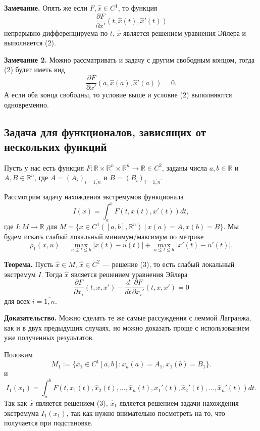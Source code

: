 \QED

\textbf{Замечание.} Опять же если $F, \widehat x \in C^1$, то функция
\[
    \frac{\partial F}{\partial x'}(t, \widehat x(t), \widehat x'(t))
\]
непрерывно дифференцируема по $t$, $\widehat x$ является решением уравнения Эйлера и выполняется (2).

\textbf{Замечание 2.} Можно рассматривать и задачу с другим свободным концом, тогда (2) будет иметь вид
\[
    \frac{\partial F}{\partial x'}(a, \widehat x(a), \widehat x'(a)) = 0.
\]
А если оба конца свободны, то условие выше и условие (2) выполняются одновременно.

\subsection{Задача для функционалов, зависящих от нескольких функций}
Пусть у нас есть функция $F: \mathbb R \times \mathbb R^n \times \mathbb R^n \to \mathbb R \in C^2$, заданы числа $a, b \in \mathbb R$ и $A, B \in \mathbb R^n$, где $A = (A_i)_{i = \overline{1, n}}$ и $B = (B_i)_{i = \overline{1, n}}$.

Рассмотрим задачу нахождения экстремумов функционала
\begin{equation}
    I(x) = \int_a^b F(t, x(t), x'(t)) dt,
\end{equation}
где $I: M \to \mathbb R$ для $M = \{x \in C^1([a, b], \mathbb R^n)~|~x(a) = A, x(b) = B\}$.
Мы будем искать слабый локальный минимум/максимум по метрике
\[
    \rho_1(x, u) = \max_{a \le t \le b} |x(t) - u(t)| + \max_{a \le t \le b}|x'(t) - u'(t)|.
\]

\textbf{Теорема.} Пусть $\widehat x \in M$, $\widehat x \in C^2$ --- решение (3), то есть слабый локальный экстремум $I$.
Тогда $\widehat x$ является решением уравнения Эйлера
\[
    \frac{\partial F}{\partial x_i}(t, x, x') - \frac{d}{dt} \frac{\partial F}{\partial x_i'}(t, x, x') = 0
\]
для всех $i = \overline{1, n}$.

\textbf{Доказательство.} Можно сделать те же самые рассуждения с леммой Лагранжа, как и в двух предыдущих случаях, но можно доказать проще с использованием уже полученных результатов.

Положим
\[
    M_1 := \{x_1 \in C^1[a, b]: x_a(a) = A_1, x_1(b) = B_1\}.
\]
и
\[
    I_1(x_1) = \int_a^b F(t, x_1(t), \widehat x_2(t), \dots, \widehat x_n(t), x_1'(t), \widehat x_2'(t), \dots, \widehat x_n'(t)) dt.
\]
Так как $\widehat x$ является решением (3), $\widehat x_1$ является решением задачи нахождения экстремума $I_1(x_1)$, так как нужно внимательно посмотреть на то, что получается при подстановке.

